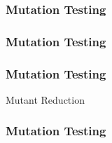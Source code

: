   \begin{frame}
    \frametitle{Mutation Testing}
    \centering
    
  \end{frame}

  \begin{frame}
    \frametitle{Mutation Testing}
    \centering
    {\fontsize{40}{40}\selectfont{Retrospective Mutant Reduction}}
  \end{frame}

  \begin{frame}
    \frametitle{Mutation Testing}
    \centering
    {\fontsize{40}{40}\selectfont{\textcolor{solarizedViolet}{Retrospective}} Mutant Reduction}
  \end{frame}

  \begin{frame}
    \frametitle{Mutation Testing}
    \centering
    {\fontsize{40}{40}}
  \end{frame}
